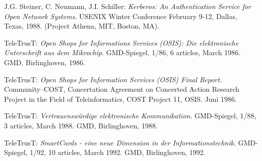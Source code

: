 \begin{thebibliography}{99}
J.G. Steiner, C. Neumann, J.I. Schiller:
{\em Kerberos: An Authentication Service for Open Network Systems}.
USENIX Winter Conference February 9-12, Dallas, Texas, 1988.
(Project Athena, MIT, Boston, MA).

TeleTrusT:
{\em Open Shops for Informations Services (OSIS):
Die elektronische Unterschrift aus dem Mikrochip}.
GMD-Spiegel, 1/86, 6 articles, March 1986.
GMD, Birlinghoven, 1986.

TeleTrusT:
{\em Open Shops for Information Services (OSIS) Final Report}.
Community--COST,
Concertation Agreement on Concerted Action Research Project
in the Field of Teleinformatics,
COST Project 11, OSIS.
Juni 1986.

TeleTrusT:
{\em Vertrauensw\"urdige elektronische Kommunikation}.
GMD-Spiegel, 1/88, 3 articles, March 1988.
GMD, Birlinghoven, 1988.

TeleTrusT:
{\em SmartCards - eine neue Dimension in der Informationstechnik}.
GMD-Spiegel, 1/92, 10 articles, March 1992.
GMD, Birlinghoven, 1992.

\end{thebibliography}
